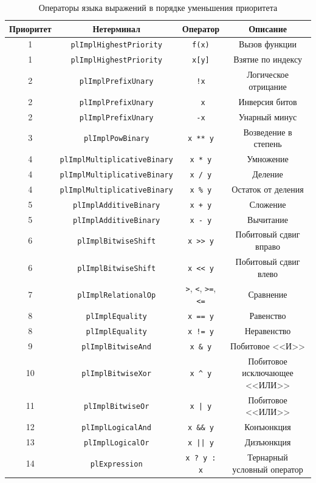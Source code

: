 \documentclass[times,specification,annotation]{style/itmo-student-thesis/itmo-student-thesis}
\begin{document}
\begin{table}[!h]
\caption{Операторы языка выражений в порядке уменьшения приоритета}\label{pl-operators-priority}
\centering
\begin{adjustbox}{angle=-90}
\begin{tabular}{|*{4}{c|}}\hline
Приоритет & Нетерминал & Оператор & Описание\\\hline
1  & \texttt{plImplHighestPriority} & \texttt{f(x)} & Вызов функции \\\hline
1  & \texttt{plImplHighestPriority} & \texttt{x[y]} & Взятие по индексу \\\hline
2  & \texttt{plImplPrefixUnary} & \texttt{!x} & Логическое отрицание \\\hline
2  & \texttt{plImplPrefixUnary} & \texttt{~x} & Инверсия битов \\\hline
2  & \texttt{plImplPrefixUnary} & \texttt{-x} & Унарный минус \\\hline
3  & \texttt{plImplPowBinary} & \texttt{x ** y} & Возведение в степень \\\hline
4  & \texttt{plImplMultiplicativeBinary} & \texttt{x * y} & Умножение \\\hline
4  & \texttt{plImplMultiplicativeBinary} & \texttt{x / y} & Деление \\\hline
4  & \texttt{plImplMultiplicativeBinary} & \texttt{x \% y} & Остаток от деления \\\hline
5  & \texttt{plImplAdditiveBinary} & \texttt{x + y} & Сложение \\\hline
5  & \texttt{plImplAdditiveBinary} & \texttt{x - y} & Вычитание \\\hline
6  & \texttt{plImplBitwiseShift} & \texttt{x >{>} y} & Побитовый сдвиг вправо \\\hline
6  & \texttt{plImplBitwiseShift} & \texttt{x <{<} y} & Побитовый сдвиг влево \\\hline
7  & \texttt{plImplRelationalOp} & \texttt{>}, \texttt{<}, \texttt{>=}, \texttt{<=} & Сравнение \\\hline
8  & \texttt{plImplEquality} & \texttt{x == y} & Равенство \\\hline
8  & \texttt{plImplEquality} & \texttt{x != y} & Неравенство \\\hline
9  & \texttt{plImplBitwiseAnd} & \texttt{x \& y} & Побитовое <<И>> \\\hline
10  & \texttt{plImplBitwiseXor}  & \texttt{x \textasciicircum~y} & Побитовое исключающее <<ИЛИ>> \\\hline
11  & \texttt{plImplBitwiseOr}  & \texttt{x | y} & Побитовое <<ИЛИ>> \\\hline
12  & \texttt{plImplLogicalAnd}  & \texttt{x \&\& y} & Конъюнкция \\\hline
13  & \texttt{plImplLogicalOr}  & \texttt{x || y} & Дизъюнкция \\\hline
14  & \texttt{plExpression}  & \texttt{x ? y : x} & Тернарный условный оператор \\\hline
\end{tabular}
\end{adjustbox}
\end{table}
\end{document}
